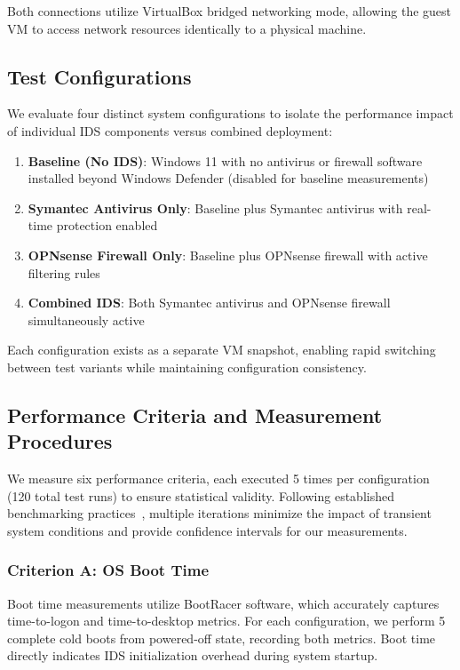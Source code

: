 \documentclass[runningheads,a4paper,english]{llncs}[2022/01/12]
\begin{document}
Both connections utilize VirtualBox bridged networking mode, allowing the guest VM to access network resources identically to a physical machine.

\subsection{Test Configurations}

We evaluate four distinct system configurations to isolate the performance impact of individual IDS components versus combined deployment:

\begin{enumerate}
\item \textbf{Baseline (No IDS)}: Windows 11 with no antivirus or firewall software installed beyond Windows Defender (disabled for baseline measurements)
\item \textbf{Symantec Antivirus Only}: Baseline plus Symantec antivirus with real-time protection enabled
\item \textbf{OPNsense Firewall Only}: Baseline plus OPNsense firewall with active filtering rules
\item \textbf{Combined IDS}: Both Symantec antivirus and OPNsense firewall simultaneously active
\end{enumerate}

Each configuration exists as a separate VM snapshot, enabling rapid switching between test variants while maintaining configuration consistency.

\subsection{Performance Criteria and Measurement Procedures}

We measure six performance criteria, each executed 5 times per configuration (120 total test runs) to ensure statistical validity. Following established benchmarking practices~\cite{TomsHardwareBenchmark, AnandTechBenchmark}, multiple iterations minimize the impact of transient system conditions and provide confidence intervals for our measurements.

\subsubsection{Criterion A: OS Boot Time}

Boot time measurements utilize BootRacer software, which accurately captures time-to-logon and time-to-desktop metrics. For each configuration, we perform 5 complete cold boots from powered-off state, recording both metrics. Boot time directly indicates IDS initialization overhead during system startup.
\end{document}
